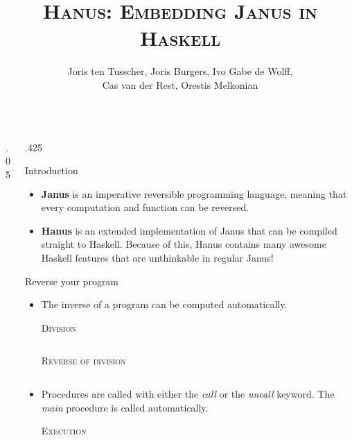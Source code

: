 \documentclass[final,hyperref={pdfpagelabels=false}]{beamer}
\title{\LARGE \textsc{Hanus: Embedding Janus in Haskell}} %
\author{\vspace{1cm} Joris ten Tusscher, Joris Burgers, Ivo Gabe de Wolff,\\ Cas van der Rest, Orestis Melkonian\vspace{1cm}} %
\institute{\Large \emph{Faculty of Science, Utrecht University}} %
\newcommand\sepsize{.05\textwidth}
\newcommand\colsize{.425\textwidth}
\newcommand{\code}[2]{
	\begin{center}
		\vspace{.5cm}
		\textsc{\small #1}\\
		\vspace{.5cm}
	\end{center}
	\begin{minipage}{.9\textwidth}
		\inputminted[frame=lines,framesep=1cm,baselinestretch=.8,linenos,fontsize=\footnotesize]
			{haskell}{code/#2.hs}
	\end{minipage}
}
\begin{document}

\begin{frame}[t] %

\begin{columns}[t] %

\begin{column}{\sepsize}\end{column} %

\begin{column}{\colsize} %


\begin{block}{Introduction}
	\begin{itemize}
		\item \textbf{Janus} is an imperative reversible programming language, meaning that every computation and function can be reversed.
		\vspace{1cm}
 		\item \textbf{Hanus} is an extended implementation of Janus that can be compiled straight to Haskell. Because of this, Hanus contains many awesome Haskell features that are unthinkable in regular Janus!
	\end{itemize}
\end{block}

\begin{block}{Reverse your program}
	\begin{itemize}
	\item The inverse of a program can be computed automatically.
		\code{Division}{divide}
		\vspace{1cm}
		\code{Reverse of division}{divide_reverse}
	\vspace{1cm}
	\item Procedures are called with either the \textit{call} or the \textit{uncall} keyword. The \textit{main} procedure is called automatically.
		\code{Execution}{call_uncall}
	\end{itemize}
\end{block}


\end{column}
\end{columns}
\end{frame}
\end{document}
